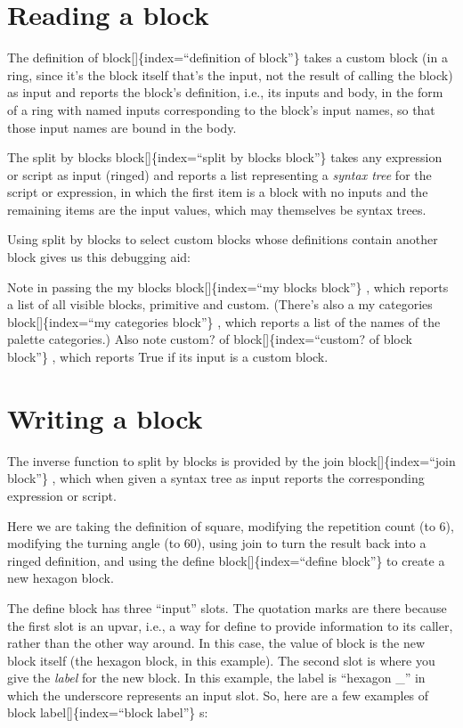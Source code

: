 \documentclass[
  letterpaper,
]{book}
\begin{document}
\section{Reading a block}\label{reading-a-block}

The definition of block{[}{]}\{index=``definition of block''\} takes a
custom block (in a ring, since it's the block itself that's the input,
not the result of calling the block) as input and reports the block's
definition, i.e., its inputs and body, in the form of a ring with named
inputs corresponding to the block's input names, so that those input
names are bound in the body.

The split by blocks block{[}{]}\{index=``split by blocks block''\} takes
any expression or script as input (ringed) and reports a list
representing a \emph{syntax tree} for the script or expression, in which
the first item is a block with no inputs and the remaining items are the
input values, which may themselves be syntax trees.

Using split by blocks to select custom blocks whose definitions contain
another block gives us this debugging aid:

Note in passing the my blocks block{[}{]}\{index=``my blocks block''\} ,
which reports a list of all visible blocks, primitive and custom.
(There's also a my categories block{[}{]}\{index=``my categories
block''\} , which reports a list of the names of the palette
categories.) Also note custom? of block{[}{]}\{index=``custom? of block
block''\} , which reports True if its input is a custom block.

\section{Writing a block}\label{writing-a-block}

The inverse function to split by blocks is provided by the join
block{[}{]}\{index=``join block''\} , which when given a syntax tree as
input reports the corresponding expression or script.

Here we are taking the definition of square, modifying the repetition
count (to 6), modifying the turning angle (to 60), using join to turn
the result back into a ringed definition, and using the define
block{[}{]}\{index=``define block''\} to create a new hexagon block.

The define block has three ``input'' slots. The quotation marks are
there because the first slot is an upvar, i.e., a way for define to
provide information to its caller, rather than the other way around. In
this case, the value of block is the new block itself (the hexagon
block, in this example). The second slot is where you give the
\emph{label} for the new block. In this example, the label is ``hexagon
\_'' in which the underscore represents an input slot. So, here are a
few examples of block label{[}{]}\{index=``block label''\} s:
\end{document}
